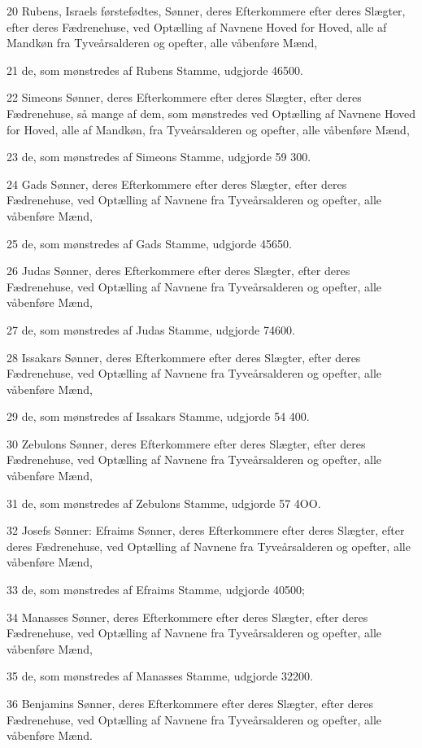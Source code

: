 \par 20 Rubens, Israels førstefødtes, Sønner, deres Efterkommere efter deres Slægter, efter deres Fædrenehuse, ved Optælling af Navnene Hoved for Hoved, alle af Mandkøn fra Tyveårsalderen og opefter, alle våbenføre Mænd,
\par 21 de, som mønstredes af Rubens Stamme, udgjorde 46500.
\par 22 Simeons Sønner, deres Efterkommere efter deres Slægter, efter deres Fædrenehuse, så mange af dem, som mønstredes ved Optælling af Navnene Hoved for Hoved, alle af Mandkøn, fra Tyveårsalderen og opefter, alle våbenføre Mænd,
\par 23 de, som mønstredes af Simeons Stamme, udgjorde 59 300.
\par 24 Gads Sønner, deres Efterkommere efter deres Slægter, efter deres Fædrenehuse, ved Optælling af Navnene fra Tyveårsalderen og opefter, alle våbenføre Mænd,
\par 25 de, som mønstredes af Gads Stamme, udgjorde 45650.
\par 26 Judas Sønner, deres Efterkommere efter deres Slægter, efter deres Fædrenehuse, ved Optælling af Navnene fra Tyveårsalderen og opefter, alle våbenføre Mænd,
\par 27 de, som mønstredes af Judas Stamme, udgjorde 74600.
\par 28 Issakars Sønner, deres Efterkommere efter deres Slægter, efter deres Fædrenehuse, ved Optælling af Navnene fra Tyveårsalderen og opefter, alle våbenføre Mænd,
\par 29 de, som mønstredes af Issakars Stamme, udgjorde 54 400.
\par 30 Zebulons Sønner, deres Efterkommere efter deres Slægter, efter deres Fædrenehuse, ved Optælling af Navnene fra Tyveårsalderen og opefter, alle våbenføre Mænd,
\par 31 de, som mønstredes af Zebulons Stamme, udgjorde 57 4OO.
\par 32 Josefs Sønner: Efraims Sønner, deres Efterkommere efter deres Slægter, efter deres Fædrenehuse, ved Optælling af Navnene fra Tyveårsalderen og opefter, alle våbenføre Mænd,
\par 33 de, som mønstredes af Efraims Stamme, udgjorde 40500;
\par 34 Manasses Sønner, deres Efterkommere efter deres Slægter, efter deres Fædrenehuse, ved Optælling af Navnene fra Tyveårsalderen og opefter, alle våbenføre Mænd,
\par 35 de, som mønstredes af Manasses Stamme, udgjorde 32200.
\par 36 Benjamins Sønner, deres Efterkommere efter deres Slægter, efter deres Fædrenehuse, ved Optælling af Navnene fra Tyveårsalderen og opefter, alle våbenføre Mænd.

